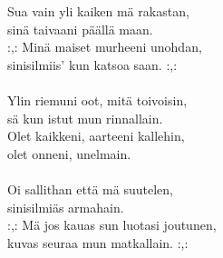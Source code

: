 
Sua vain yli kaiken mä rakastan, \\ sinä taivaani päällä maan. \\ :,: Minä maiset murheeni unohdan, \\ sinisilmiis' kun katsoa saan. :,: \\ \hspace{10mm} \\ Ylin riemuni oot, mitä toivoisin, \\ sä kun istut mun rinnallain. \\ Olet kaikkeni, aarteeni kallehin, \\ olet onneni, unelmain. \\ \hspace{10mm} \\ Oi sallithan että mä suutelen, \\ sinisilmiäs armahain. \\ :,: Mä jos kauas sun luotasi joutunen, \\ kuvas seuraa mun matkallain. :,: